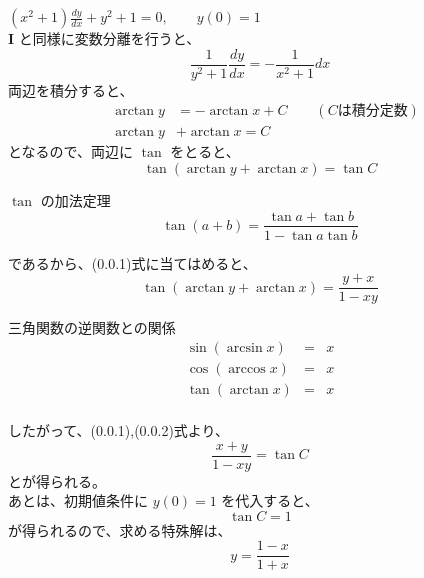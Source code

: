 \documentclass[a4j]{jsarticle}
\begin{document}
\begin{spacing}{1.6}
\begin{qparts}
    \qpart $ \displaystyle (x^2 + 1)\frac{dy}{dx} + y ^ 2 + 1 = 0, \qquad y(0) = 1 $ \\
    {\bf I} と同様に変数分離を行うと、\\
    \begin{equation*}
      \frac{1}{y ^ 2 + 1} \frac{dy}{dx} = - \frac{1}{x ^ 2 + 1}dx
    \end{equation*}
    両辺を積分すると、\\
    \begin{eqnarray*}
      & \arctan y & = - \arctan x + C \qquad (Cは積分定数) \\
      & \arctan y & + \arctan x = C
    \end{eqnarray*}
    となるので、両辺に $ \tan $ をとると、\\
    \begin{equation}
      \tan (\arctan y + \arctan x) = \tan C
    \end{equation}
    \begin{itembox}{$ \tan $ の加法定理}
      \begin{equation*}
        \tan(a + b) = \frac{\tan a + \tan b}{1 - \tan a \tan b}
      \end{equation*}
    \end{itembox}
    であるから、(0.0.1)式に当てはめると、\\
    \begin{equation}
      \tan (\arctan y + \arctan x) = \frac{y + x}{1 - xy}
    \end{equation}
    \begin{itembox}[l]{三角関数の逆関数との関係}
      \begin{eqnarray*}
        \sin(\arcsin x) & = & x \\
        \cos(\arccos x) & = & x \\
        \tan(\arctan x) & = & x \\
      \end{eqnarray*}
    \end{itembox}
    したがって、(0.0.1),(0.0.2)式より、\\
    \begin{equation*}
      \frac{x + y}{1 - xy} = \tan C
    \end{equation*}
    とが得られる。\\
    あとは、初期値条件に $ y(0) = 1 $ を代入すると、
    \begin{equation*}
      \tan C = 1
    \end{equation*}
    が得られるので、求める特殊解は、\\
    \begin{equation*}
      y = \frac{1 - x}{1 + x}
    \end{equation*}
  \end{qparts}
\end{spacing}
\end{document}
